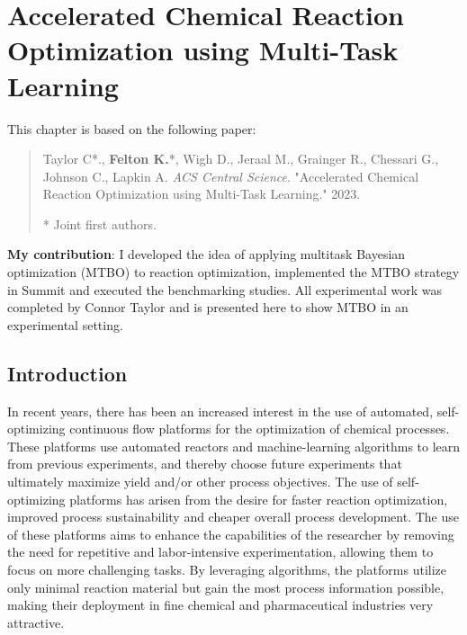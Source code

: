 \chapter{Accelerated Chemical Reaction Optimization using Multi-Task Learning}\label{ch:mtbo} 
This chapter is based on the following paper:

\begin{quote}
    Taylor C*., \textbf{Felton K.}*, Wigh D., Jeraal M., Grainger R., Chessari G., Johnson C., Lapkin A. \textit{ACS Central Science}. "Accelerated Chemical Reaction Optimization using Multi-Task Learning." 2023.

    * Joint first authors.
\end{quote}


\textbf{My contribution}: I developed  the idea of applying multitask Bayesian optimization (MTBO) to reaction optimization, implemented the MTBO strategy in Summit and executed the benchmarking studies. All experimental work was completed by Connor Taylor and is presented here to show MTBO in an experimental setting.

\section{Introduction}

In recent years, there has been an increased interest in the use of automated, self-optimizing continuous flow platforms for the optimization of chemical processes.\cite{Reizman2016a, Fabry2016, Fitzpatrick2016, CortesBorda2016} These platforms use automated reactors and machine-learning algorithms to learn from previous experiments, and thereby choose future experiments that ultimately maximize yield and/or other process objectives. The use of self-optimizing platforms has arisen from the desire for faster reaction optimization, improved process sustainability and cheaper overall process development. The use of these platforms aims to enhance the capabilities of the researcher by removing the need for repetitive and labor-intensive experimentation, allowing them to focus on more challenging tasks. By leveraging algorithms, the platforms utilize only minimal reaction material but gain the most process information possible, making their deployment in fine chemical and pharmaceutical industries very attractive.\cite{Clayton2019, Clayton2020}

